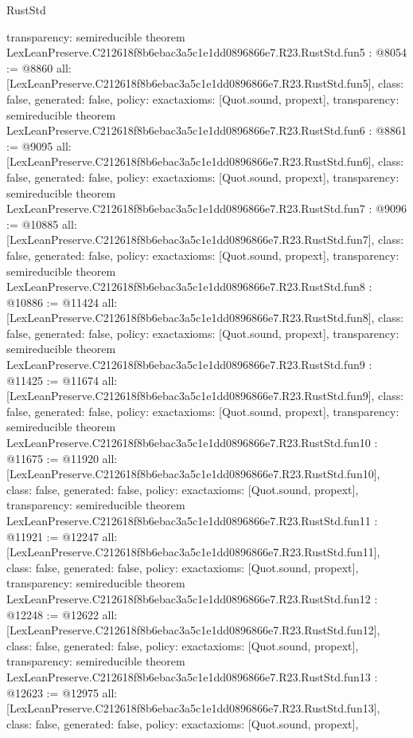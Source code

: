 \begin{lexlean}{RustStd}
\begin{coremodule}
{  transparency: semireducible
}
theorem LexLeanPreserve.C212618f8b6ebac3a5c1e1dd0896866e7.R23.RustStd.fun5 : @8054 := @8860 {
  all: [LexLeanPreserve.C212618f8b6ebac3a5c1e1dd0896866e7.R23.RustStd.fun5],
  class: false,
  generated: false,
  policy: exact{axioms: [Quot.sound, propext]},
  transparency: semireducible
}
theorem LexLeanPreserve.C212618f8b6ebac3a5c1e1dd0896866e7.R23.RustStd.fun6 : @8861 := @9095 {
  all: [LexLeanPreserve.C212618f8b6ebac3a5c1e1dd0896866e7.R23.RustStd.fun6],
  class: false,
  generated: false,
  policy: exact{axioms: [Quot.sound, propext]},
  transparency: semireducible
}
theorem LexLeanPreserve.C212618f8b6ebac3a5c1e1dd0896866e7.R23.RustStd.fun7 : @9096 := @10885 {
  all: [LexLeanPreserve.C212618f8b6ebac3a5c1e1dd0896866e7.R23.RustStd.fun7],
  class: false,
  generated: false,
  policy: exact{axioms: [Quot.sound, propext]},
  transparency: semireducible
}
theorem LexLeanPreserve.C212618f8b6ebac3a5c1e1dd0896866e7.R23.RustStd.fun8 : @10886 := @11424 {
  all: [LexLeanPreserve.C212618f8b6ebac3a5c1e1dd0896866e7.R23.RustStd.fun8],
  class: false,
  generated: false,
  policy: exact{axioms: [Quot.sound, propext]},
  transparency: semireducible
}
theorem LexLeanPreserve.C212618f8b6ebac3a5c1e1dd0896866e7.R23.RustStd.fun9 : @11425 := @11674 {
  all: [LexLeanPreserve.C212618f8b6ebac3a5c1e1dd0896866e7.R23.RustStd.fun9],
  class: false,
  generated: false,
  policy: exact{axioms: [Quot.sound, propext]},
  transparency: semireducible
}
theorem LexLeanPreserve.C212618f8b6ebac3a5c1e1dd0896866e7.R23.RustStd.fun10 : @11675 := @11920 {
  all: [LexLeanPreserve.C212618f8b6ebac3a5c1e1dd0896866e7.R23.RustStd.fun10],
  class: false,
  generated: false,
  policy: exact{axioms: [Quot.sound, propext]},
  transparency: semireducible
}
theorem LexLeanPreserve.C212618f8b6ebac3a5c1e1dd0896866e7.R23.RustStd.fun11 : @11921 := @12247 {
  all: [LexLeanPreserve.C212618f8b6ebac3a5c1e1dd0896866e7.R23.RustStd.fun11],
  class: false,
  generated: false,
  policy: exact{axioms: [Quot.sound, propext]},
  transparency: semireducible
}
theorem LexLeanPreserve.C212618f8b6ebac3a5c1e1dd0896866e7.R23.RustStd.fun12 : @12248 := @12622 {
  all: [LexLeanPreserve.C212618f8b6ebac3a5c1e1dd0896866e7.R23.RustStd.fun12],
  class: false,
  generated: false,
  policy: exact{axioms: [Quot.sound, propext]},
  transparency: semireducible
}
theorem LexLeanPreserve.C212618f8b6ebac3a5c1e1dd0896866e7.R23.RustStd.fun13 : @12623 := @12975 {
  all: [LexLeanPreserve.C212618f8b6ebac3a5c1e1dd0896866e7.R23.RustStd.fun13],
  class: false,
  generated: false,
  policy: exact{axioms: [Quot.sound, propext]},
}
\end{coremodule}
\end{lexlean}
